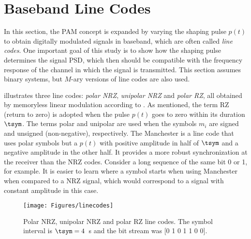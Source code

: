 
\section{Baseband Line Codes}
\label{sec:linecodes}

In this section, the PAM concept is expanded by varying the shaping pulse $p(t)$ to obtain 
digitally modulated signals in baseband, which are often called \emph{line codes}. One important goal of this study is to show how the shaping pulse determines the signal PSD, which then should be compatible with
the frequency response of the channel in which the signal is transmitted.
This section assumes binary systems, but $M$-ary versions of line codes are also used.

 illustrates three line codes: \emph{polar NRZ}, \emph{unipolar NRZ} and \emph{polar RZ}, all obtained by memoryless linear modulation according to . As mentioned, the term RZ (return to zero) is adopted when the pulse $p(t)$ goes to zero within its duration $\tsym$. The terms polar and unipolar are used when the symbols $m_i$ are signed and unsigned (non-negative), respectively. The Manchester is a line code that uses polar symbols but a $p(t)$ with positive amplitude in half of $\tsym$ and a negative amplitude in the other half. It provides a more robust synchronization at the receiver than the NRZ codes. Consider a long sequence of the same bit 0 or 1, for example. It is easier to learn where a symbol starts when using Manchester when compared to a NRZ signal, which would correspond to a signal with constant amplitude in this case.

\begin{figure}[htbp]
\centering
\texttt{[image: Figures/linecodes]}
\caption[{Polar NRZ, unipolar NRZ, polar RZ and Manchester line codes.}]{Polar NRZ, unipolar NRZ and polar RZ line codes. The symbol interval is $\tsym=4$~s and the bit stream was [0 1 0 1 1 0 0].\label{fig:linecodes}}
\end{figure}


